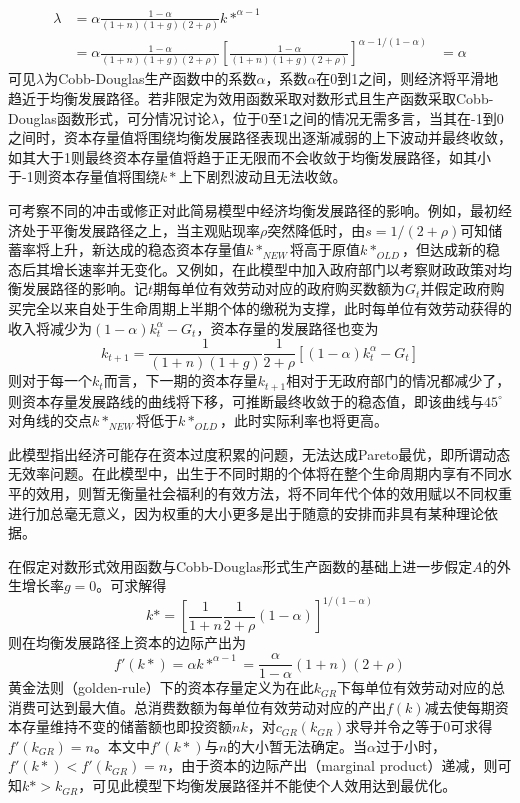 \documentclass[supercite]{HustGraduPaper}
\begin{document}
    \begin{equation}
    \begin{aligned}
    \lambda &=\alpha\frac{1-\alpha}{(1+n)(1+g)(2+\rho)}k*^{\alpha-1}\\
    &=\alpha\frac{1-\alpha}{(1+n)(1+g)(2+\rho)}[\frac{1-\alpha}{(1+n)(1+g)(2+\rho)}]^{\alpha-1/(1-\alpha)}
    &=\alpha
    \end{aligned}
    \end{equation}
    可见$\lambda$为Cobb-Douglas生产函数中的系数$\alpha$，系数$\alpha$在0到1之间，则经济将平滑地趋近于均衡发展路径。若非限定为效用函数采取对数形式且生产函数采取Cobb-Douglas函数形式，可分情况讨论$\lambda$，位于0至1之间的情况无需多言，当其在-1到0之间时，资本存量值将围绕均衡发展路径表现出逐渐减弱的上下波动并最终收敛，如其大于1则最终资本存量值将趋于正无限而不会收敛于均衡发展路径，如其小于-1则资本存量值将围绕$k*$上下剧烈波动且无法收敛。    
    
    可考察不同的冲击或修正对此简易模型中经济均衡发展路径的影响。例如，最初经济处于平衡发展路径之上，当主观贴现率$\rho$突然降低时，由$s=1/(2+\rho)$可知储蓄率将上升，新达成的稳态资本存量值$k*_{NEW}$将高于原值$k*_{OLD}$，但达成新的稳态后其增长速率并无变化。又例如，在此模型中加入政府部门以考察财政政策对均衡发展路径的影响。记$t$期每单位有效劳动对应的政府购买数额为$G_t$并假定政府购买完全以来自处于生命周期上半期个体的缴税为支撑，此时每单位有效劳动获得的收入将减少为$(1-\alpha)k_t^\alpha-G_t$，资本存量的发展路径也变为
    \begin{equation}
    k_{t+1}=\frac{1}{(1+n)(1+g)}\frac{1}{2+\rho}[(1-\alpha)k_{t}^\alpha-G_t]
    \end{equation}
    则对于每一个$k_t$而言，下一期的资本存量$k_{t+1}$相对于无政府部门的情况都减少了，则资本存量发展路线的曲线将下移，可推断最终收敛于的稳态值，即该曲线与$45^{\circ}$对角线的交点$k*_{NEW}$将低于$k*_{OLD}$，此时实际利率也将更高。

    此模型指出经济可能存在资本过度积累的问题，无法达成Pareto最优，即所谓动态无效率问题。在此模型中，出生于不同时期的个体将在整个生命周期内享有不同水平的效用，则暂无衡量社会福利的有效方法，将不同年代个体的效用赋以不同权重进行加总毫无意义，因为权重的大小更多是出于随意的安排而非具有某种理论依据。

    在假定对数形式效用函数与Cobb-Douglas形式生产函数的基础上进一步假定$A$的外生增长率$g=0$。可求解得
    \begin{equation}
    k*=[\frac{1}{1+n}\frac{1}{2+\rho}(1-\alpha)]^{1/(1-\alpha)}
    \end{equation}
    则在均衡发展路径上资本的边际产出为
    \begin{equation}
    f'(k*)=\alpha k*^{\alpha-1}=\frac{\alpha}{1-\alpha}(1+n)(2+\rho)
    \end{equation}
    黄金法则（golden-rule）下的资本存量定义为在此$k_{GR}$下每单位有效劳动对应的总消费可达到最大值。总消费数额为每单位有效劳动对应的产出$f(k)$减去使每期资本存量维持不变的储蓄额也即投资额$nk$，对$c_{GR}(k_{GR})$求导并令之等于0可求得$f'(k_{GR})=n$。本文中$f'(k*)$与$n$的大小暂无法确定。当$\alpha$过于小时，$f'(k*)<f'(k_{GR})=n$，由于资本的边际产出（marginal product）递减，则可知$k*>k_{GR}$，可见此模型下均衡发展路径并不能使个人效用达到最优化。
\end{document}
